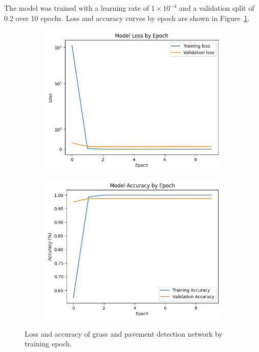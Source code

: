 \documentclass[titlepage, twocolumn]{article}
\begin{document}
            The model was trained with a learning rate of $1 \times 10^{-4}$ and a validation split of 0.2 over 10 epochs. Loss and accuracy curves by epoch are shown in Figure~\ref{fig:grasspavegraphs}.

            \begin{figure}
                \begin{center}
                    \begin{subfigure}{0.5\linewidth}
                        \centering
                        \includegraphics[width=0.9\linewidth]{grasspaveloss.png}
                      \end{subfigure}%
                      \begin{subfigure}{0.5\linewidth}
                        \centering
                        \includegraphics[width=0.9\linewidth]{grasspaveacc.png}
                      \end{subfigure}
                \end{center}
                \caption{Loss and accuracy of grass and pavement detection network by training epoch.}
                \label{fig:grasspavegraphs}
            \end{figure}
\end{document}
